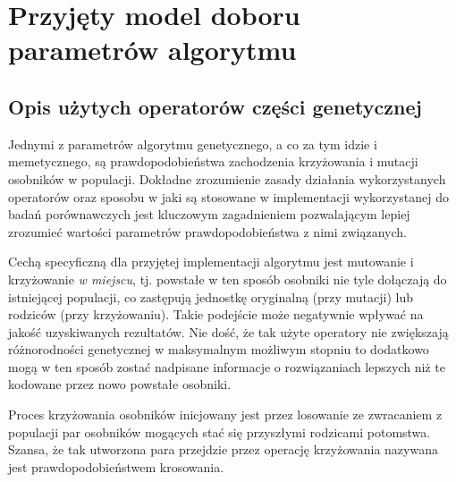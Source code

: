 \newpage
\chapter{Przyjęty model doboru parametrów algorytmu}
\label{ch:przyjety_model_doboru_parametrow_algorytmu}
\section{Opis użytych operatorów części genetycznej}
\par
Jednymi z parametrów algorytmu genetycznego, a co za tym idzie i memetycznego, są prawdopodobieństwa zachodzenia krzyżowania i mutacji osobników w populacji. Dokładne zrozumienie zasady działania wykorzystanych operatorów oraz sposobu w jaki są stosowane w implementacji wykorzystanej do badań porównawczych jest kluczowym zagadnieniem pozwalającym lepiej zrozumieć wartości parametrów prawdopodobieństwa z nimi związanych. 
\par 
Cechą specyficzną dla przyjętej implementacji algorytmu jest mutowanie i krzyżowanie \emph{w miejscu}, tj. powstałe w ten sposób osobniki nie tyle dołączają do istniejącej populacji, co zastępują jednostkę oryginalną (przy mutacji) lub rodziców (przy krzyżowaniu). Takie podejście może negatywnie wpływać na jakość uzyskiwanych rezultatów. Nie dość, że tak użyte operatory nie zwiększają różnorodności genetycznej w maksymalnym możliwym stopniu to dodatkowo mogą w ten sposób zostać nadpisane informacje o rozwiązaniach lepszych niż te kodowane przez nowo powstałe osobniki.
\par
Proces krzyżowania osobników inicjowany jest przez losowanie ze zwracaniem z populacji par osobników mogących stać się przyszłymi rodzicami potomstwa. Szansa, że tak utworzona para przejdzie przez operację krzyżowania nazywana jest prawdopodobieństwem krosowania. 
\par
